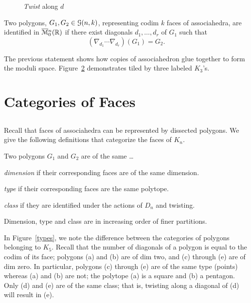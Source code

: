 \documentclass[10pt]{amsart}
\begin{document}
\begin{figure} [h]
\caption{{\em Twist} along $d$}
\label{twist}
\end{figure}

\begin{thm} \textup{\cite[\S4]{dev}}
Two polygons, $G_1, G_2 \in {\mathcal G}(n,k)$, representing codim $k$ faces of associahedra, are identified in ${\overline{\mathcal M}}{^{n}_0({\mathbb R})}$ if there exist diagonals $d_1, \ldots, d_r$ of $G_1$ such that $$(\nabla_{d_1} \cdots \nabla_{d_r}) (G_1) = G_2.$$
\label{t:glue}
\end{thm}

\noindent The previous statement shows how copies of associahedron glue together
to form the moduli space. Figure~\ref{m04} demonstrates  tiled by three labeled $K_3$'s.

\begin{figure} [h]
\caption{}
\label{m04}
\end{figure}

%
%

\section {Categories of Faces}

\subsection{}
Recall that faces of associahedra can be represented by dissected polygons.  We give the following definitions that categorize the faces of $K_n$.

\begin{defn}
Two polygons $G_1$ and $G_2$ are of the same \ldots 

\emph{dimension} if their corresponding faces are of the same dimension.

\emph{type} if their corresponding faces are the same polytope.

\emph{class} if they are identified under the actions of $D_n$ and twisting.

\noindent Dimension, type and class are in increasing order of finer partitions.
\end{defn}

\begin{exmp}
In Figure~\ref{types}, we note the difference between the categories of polygons belonging to $K_5$. Recall that the number of diagonals of a polygon is equal to the codim of its face; polygons (a) and (b) are of dim two, and (c) through (e) are of dim zero.  In particular, polygons (c) through (e) are of the same type (points) whereas (a) and (b) are not; the polytope (a) is a square and (b) a pentagon. Only (d) and (e) are of the same class; that is, twisting along a diagonal of (d) will result in (e). 
\end{exmp}
\end{document}
